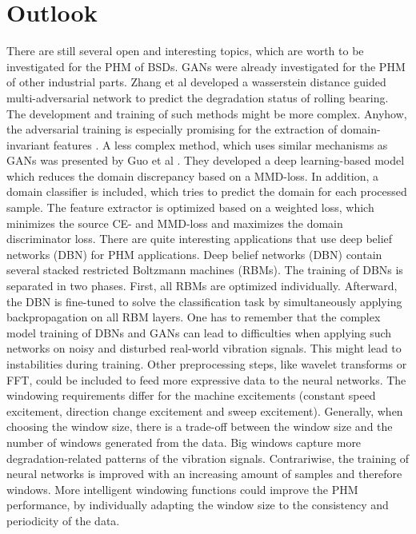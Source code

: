 \chapter{Outlook}
There are still several open and interesting topics, which are worth to be investigated for the PHM of BSDs. GANs were already investigated for the PHM of other industrial parts. Zhang et al \cite{Zhang2019} developed a wasserstein distance guided multi-adversarial network to predict the degradation status of rolling bearing. The development and training of such methods might be more complex. Anyhow, the adversarial training is especially promising for the extraction of domain-invariant features \cite{Zhang2019}. A less complex method, which uses similar mechanisms as GANs was presented by Guo et al \cite{Guo2019}. They developed a deep learning-based model which reduces the domain discrepancy based on a MMD-loss. In addition, a domain classifier is included, which tries to predict the domain for each processed sample. The feature extractor is optimized based on a weighted loss, which minimizes the source CE- and MMD-loss and maximizes the domain discriminator loss. There are quite interesting applications that use deep belief networks (DBN) \cite{ZHAO2019213} for PHM applications. Deep belief networks (DBN) contain several stacked restricted Boltzmann machines (RBMs). The training of DBNs is separated in two phases. First, all RBMs are optimized individually. Afterward, the DBN is fine-tuned to solve the classification task by simultaneously applying backpropagation on all RBM layers. One has to remember that the complex model training of DBNs and GANs can lead to difficulties when applying such networks on noisy and disturbed real-world vibration signals. This might lead to instabilities during training. Other preprocessing steps, like wavelet transforms or FFT, could be included to feed more expressive data to the neural networks. The windowing requirements differ for the machine excitements (constant speed excitement, direction change excitement and sweep excitement). Generally, when choosing the window size, there is a trade-off between the window size and the number of windows generated from the data. Big windows capture more degradation-related patterns of the vibration signals. Contrariwise, the training of neural networks is improved with an increasing amount of samples and therefore windows.  More intelligent windowing functions could improve the PHM performance, by individually adapting the window size to the consistency and periodicity of the data.






